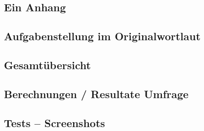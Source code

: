 \begin{appendix} %
\section{Ein Anhang}

\subsection{Aufgabenstellung im Originalwortlaut}


\subsection{Gesamtübersicht}


\subsection{Berechnungen / Resultate Umfrage}


\subsection{Tests – Screenshots}

\end{appendix}
